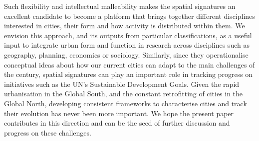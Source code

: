 Such flexibility and intellectual malleability makes the spatial signatures
an excellent candidate to become a platform that brings together different
disciplines interested in cities, their form and how activity is distributed
within them. We envision this approach, and its outputs from particular
classifications, as a useful input to integrate urban form and function in
research across disciplines such as geography, planning, economics or
sociology.
Similarly, since they operationalise conceptual ideas about how our current
cities can adapt to the main challenges of the century, spatial signatures
can play an important role in tracking progress on initiatives such as the
UN's Sustainable Development Goals.
%
Given the rapid urbanisation in the Global South, and the constant
retrofitting of cities in the Global North, developing consistent frameworks
to characterise cities and track their evolution has never been more
important.
%
We hope the present paper contributes in this direction and can be the seed
of further discussion and progress on these challenges.



